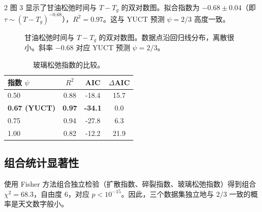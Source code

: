\documentclass[11pt,a4paper]{article}
\begin{document}
\begin{multicols}{2}
		图 3 显示了甘油松弛时间与 \(T - T_g\) 的双对数图。拟合指数为 \(-0.68 \pm 0.04\)（即 \(\tau \sim (T - T_g)^{-0.68}\)），\(R^2 = 0.97\)。这与 YUCT 预测 \(\psi = 2/3\) 高度一致。
		
		\begin{figure}[htbp]
			\centering
			\caption{甘油松弛时间与 \(T - T_g\) 的双对数图。数据点沿回归线分布，离散很小。斜率 \(-0.68\) 对应 YUCT 预测 \(\psi = 2/3\)。}
			\label{fig:glass}
		\end{figure}
		
		\begin{table}[htbp]
			\centering
			\caption{玻璃松弛指数的比较。}
			\label{tab:glass}
			\begin{tabular}{lccc}
				\toprule
				指数 $\psi$ & $R^2$ & AIC & $\Delta$AIC \\
				\midrule
				0.50 & 0.88 & -18.4 & 15.7 \\
				\textbf{0.67 (YUCT)} & \textbf{0.97} & \textbf{-34.1} & 0.0 \\
				0.75 & 0.94 & -27.8 & 6.3 \\
				1.00 & 0.82 & -12.2 & 21.9 \\
				\bottomrule
			\end{tabular}
		\end{table}
		
		\subsection{组合统计显著性}
		使用 Fisher 方法组合独立检验（扩散指数、碎裂指数、玻璃松弛指数）得到组合 \(\chi^2 = 68.3\)，自由度 6，对应 \(p < 10^{-15}\)。因此，三个数据集独立地与 \(2/3\) 一致的概率是天文数字般小。
		

\end{multicols}
\end{document}
